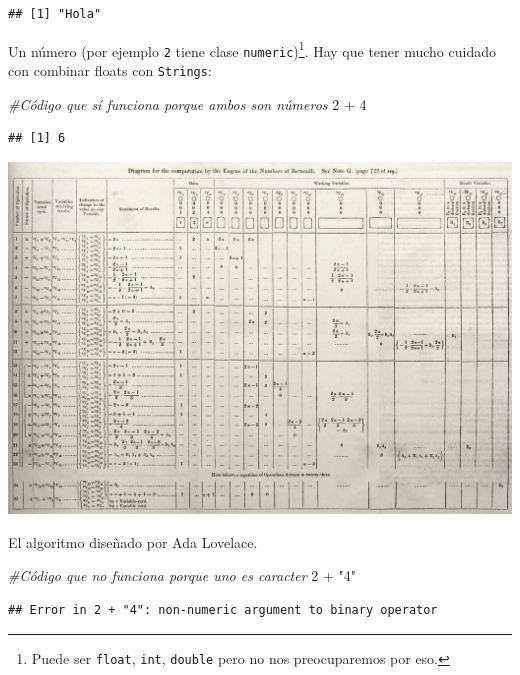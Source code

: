 \documentclass[]{tufte-book}
\newenvironment{Shaded}{}{}
\newcommand{\CommentTok}[1]{\textcolor[rgb]{0.38,0.63,0.69}{\textit{#1}}}
\newcommand{\DecValTok}[1]{\textcolor[rgb]{0.25,0.63,0.44}{#1}}
\newcommand{\SpecialCharTok}[1]{\textcolor[rgb]{0.25,0.44,0.63}{#1}}
\newcommand{\StringTok}[1]{\textcolor[rgb]{0.25,0.44,0.63}{#1}}
\begin{document}
\begin{verbatim}
## [1] "Hola"
\end{verbatim}

Un número (por ejemplo \texttt{2} tiene clase
\texttt{numeric})\footnote{Puede ser \texttt{float}, \texttt{int},
  \texttt{double} pero no nos preocuparemos por eso.}. Hay que tener
mucho cuidado con combinar floats con \texttt{Strings}:

\begin{Shaded}
\begin{Highlighting}[]
\CommentTok{\#Código que sí funciona porque ambos son números}
\DecValTok{2} \SpecialCharTok{+} \DecValTok{4} 
\end{Highlighting}
\end{Shaded}

\begin{verbatim}
## [1] 6
\end{verbatim}

\begin{marginfigure}
\includegraphics[width=26.67in]{images/algorithm_lovelace} \caption[El algoritmo diseñado por Ada Lovelace]{El algoritmo diseñado por Ada Lovelace.}\label{fig:unnamed-chunk-39}
\end{marginfigure}

\begin{Shaded}
\begin{Highlighting}[]
\CommentTok{\#Código que no funciona porque uno es caracter}
\DecValTok{2} \SpecialCharTok{+} \StringTok{"4"} 
\end{Highlighting}
\end{Shaded}

\begin{verbatim}
## Error in 2 + "4": non-numeric argument to binary operator
\end{verbatim}
\end{document}
